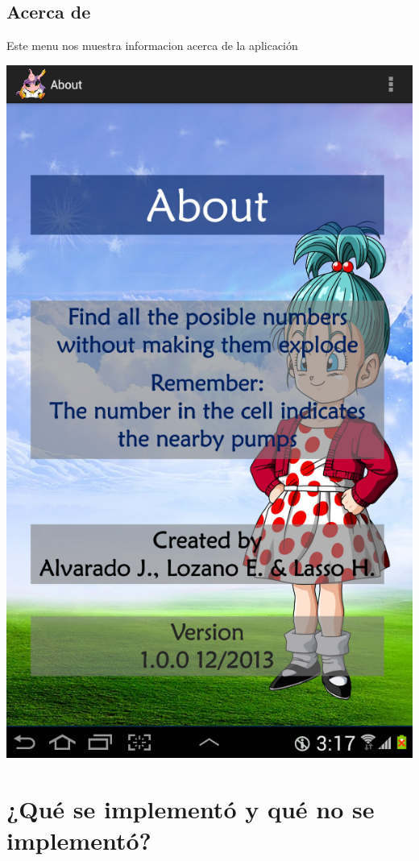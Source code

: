 \documentclass[11pt]{article} %
\begin{document}
\subsection{Acerca de}
Este menu nos muestra informacion acerca de la aplicación
\begin{center}
\includegraphics[scale=0.2]{Imagenes/SSAbout.png}
\end{center}

\section{¿Qué se implementó y qué no se implementó? }
\end{document}
